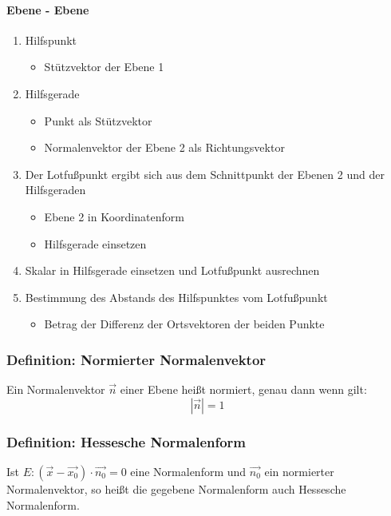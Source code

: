 \documentclass{article}
\begin{document}
  \paragraph{Ebene - Ebene}
  \begin{enumerate}
  	\item Hilfspunkt
  	\begin{itemize}
  		\item Stützvektor der Ebene 1
  	\end{itemize}
  	\item Hilfsgerade
  	\begin{itemize}
  		\item Punkt als Stützvektor
  		\item Normalenvektor der Ebene 2 als Richtungsvektor
  	\end{itemize}
  	\item Der Lotfußpunkt ergibt sich aus dem Schnittpunkt der Ebenen 2 und der Hilfsgeraden
  	\begin{itemize}
  		\item Ebene 2 in Koordinatenform
  		\item Hilfsgerade einsetzen
  	\end{itemize}
  	\item Skalar in Hilfsgerade einsetzen und Lotfußpunkt ausrechnen
  	\item Bestimmung des Abstands des Hilfspunktes vom Lotfußpunkt
  	\begin{itemize}
  		\item Betrag der Differenz der Ortsvektoren der beiden Punkte
  	\end{itemize}
  \end{enumerate}
  
  \subsubsection{Definition: Normierter Normalenvektor}
  Ein Normalenvektor $\vec{n}$ einer Ebene heißt normiert, genau dann wenn gilt: 
  \begin{equation*}
  	|\vec{n}| = 1
  \end{equation*}
  
  \subsubsection{Definition: Hessesche Normalenform}
  Ist $E:(\vec{x} - \vec{x_0}) \cdot \vec{n_0} = 0$ eine Normalenform und $\vec{n_0}$ ein normierter Normalenvektor, so heißt die gegebene Normalenform auch Hessesche Normalenform.
  
\end{document}
